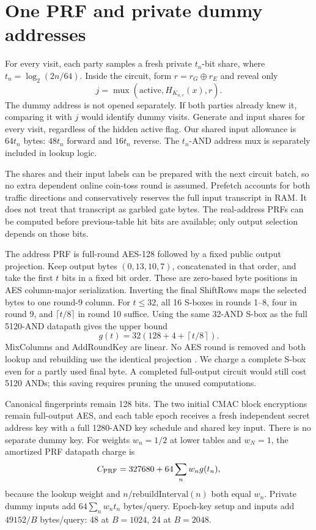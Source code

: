 \documentclass[11pt]{article}
\begin{document}
\section{One PRF and private dummy addresses}
For every visit, each party samples a fresh private $t_n$-bit share,
where $t_n=\log_2(2n/64)$. Inside the circuit, form
$r=r_G\oplus r_E$ and reveal only
\[
 j=\operatorname{mux}(\mathrm{active},H_{K_{n,e}}(x),r).
\]
The dummy address is not opened separately. If both parties already knew
it, comparing it with $j$ would identify dummy visits. Generate and input
shares for every visit, regardless of the hidden active flag. Our shared
input allowance is $64t_n$ bytes: $48t_n$ forward and $16t_n$ reverse.
The $t_n$-AND address mux is separately included in lookup logic.

The shares and their input labels can be prepared with the next circuit
batch, so no extra dependent online coin-toss round is assumed. Prefetch
accounts for both traffic directions and conservatively reserves the full
input transcript in RAM. It does not treat that transcript as garbled
gate bytes. The real-address PRFs can be computed before previous-table
hit bits are available; only output selection depends on those bits.

The address PRF is full-round AES-128 followed by a fixed public output
projection. Keep output bytes $(0,13,10,7)$, concatenated in that order,
and take the first $t$ bits in a fixed bit order. These are zero-based byte
positions in AES column-major serialization. Inverting the final
ShiftRows maps the selected bytes to one round-9 column. For $t\leq32$,
all 16 S-boxes in rounds 1--8, four in round 9, and $\lceil t/8\rceil$
in round 10 suffice. Using the same 32-AND S-box as the full 5120-AND
datapath gives the upper bound
\[
 g(t)=32\left(128+4+\left\lceil t/8\right\rceil\right).
\]
MixColumns and AddRoundKey are linear. No AES round is removed and both
lookup and rebuilding use the identical projection
\cite{nist-fips197,nist-aes}. We charge a complete S-box even for a partly
used final byte. A completed full-output circuit would still cost 5120
ANDs; this saving requires pruning the unused computations.


Canonical fingerprints remain 128 bits. The two initial CMAC block
encryptions remain full-output AES, and each table epoch receives a fresh
independent secret address key with a full 1280-AND key schedule and shared
key input. There is no separate dummy key. For weights $w_n=1/2$ at lower
tables and $w_N=1$, the amortized PRF datapath charge is
\[
 C_{\rm PRF}=327680+64\sum_n w_n g(t_n),
\]
because the lookup weight and $n/\mathrm{rebuildInterval}(n)$ both equal
$w_n$. Private dummy inputs add $64\sum_nw_nt_n$ bytes/query. Epoch-key
setup and inputs add $49152/B$ bytes/query: 48 at $B=1024$, 24 at $B=2048$.
\end{document}
